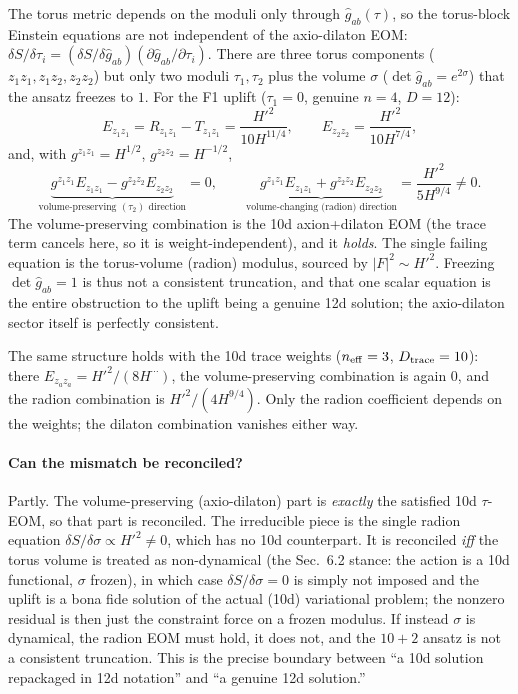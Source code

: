 The torus metric depends on the moduli only through $\hat g_{ab}(\tau)$, so the torus-block Einstein
equations are not independent of the axio-dilaton EOM: $\delta S/\delta\tau_i =
(\delta S/\delta\hat g_{ab})(\partial\hat g_{ab}/\partial\tau_i)$. There are three torus components
($z_1z_1,z_1z_2,z_2z_2$) but only two moduli $\tau_1,\tau_2$ plus the volume $\sigma$
($\det\hat g_{ab}=e^{2\sigma}$) that the ansatz freezes to $1$. For the F1 uplift ($\tau_1=0$,
genuine $n=4$, $D=12$):
\[
E_{z_1z_1}=R_{z_1z_1}-T_{z_1z_1}=\frac{H'^2}{10 H^{11/4}},\qquad
E_{z_2z_2}=\frac{H'^2}{10 H^{7/4}},
\]
and, with $g^{z_1z_1}=H^{1/2}$, $g^{z_2z_2}=H^{-1/2}$,
\[
\underbrace{g^{z_1z_1}E_{z_1z_1}-g^{z_2z_2}E_{z_2z_2}}_{\text{volume-preserving }(\tau_2)\text{ direction}} = 0,
\qquad
\underbrace{g^{z_1z_1}E_{z_1z_1}+g^{z_2z_2}E_{z_2z_2}}_{\text{volume-changing (radion) direction}} = \frac{H'^2}{5 H^{9/4}}\neq 0.
\]
The volume-preserving combination is the 10d axion+dilaton EOM (the trace term cancels here, so it is
weight-independent), and it \emph{holds}. The single failing equation is the torus-volume (radion)
modulus, sourced by $|F|^2\sim H'^2$. Freezing $\det\hat g_{ab}=1$ is thus not a consistent
truncation, and that one scalar equation is the entire obstruction to the uplift being a genuine 12d
solution; the axio-dilaton sector itself is perfectly consistent.

The same structure holds with the 10d trace weights ($n_{\rm eff}=3$, $D_{\rm trace}=10$): there
$E_{z_az_a}=H'^2/(8H^{\cdots})$, the volume-preserving combination is again $0$, and the radion
combination is $H'^2/(4H^{9/4})$. Only the radion coefficient depends on the weights; the dilaton
combination vanishes either way.

\paragraph{Can the mismatch be reconciled?} Partly. The volume-preserving (axio-dilaton) part is
\emph{exactly} the satisfied 10d $\tau$-EOM, so that part is reconciled. The irreducible piece is the
single radion equation $\delta S/\delta\sigma\propto H'^2\neq 0$, which has no 10d counterpart. It is
reconciled \emph{iff} the torus volume is treated as non-dynamical (the Sec.~6.2 stance: the action is
a 10d functional, $\sigma$ frozen), in which case $\delta S/\delta\sigma=0$ is simply not imposed and
the uplift is a bona fide solution of the actual (10d) variational problem; the nonzero residual is
then just the constraint force on a frozen modulus. If instead $\sigma$ is dynamical, the radion EOM
must hold, it does not, and the $10+2$ ansatz is not a consistent truncation. This is the precise
boundary between ``a 10d solution repackaged in 12d notation'' and ``a genuine 12d solution.''

